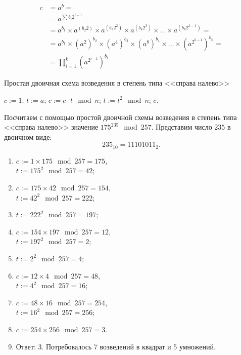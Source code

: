 \[\begin{array}{ll}
c & = a^b = \\
  & = a^{\sum b_i 2^{i-1}} = \\
  & = a^{b_1} \times a^{(b_2 2)} \times a^{(b_3 2^2)} \times a^{(b_4 2^3)} \times \dots \times a^{(b_k 2^{k-1})} = \\
  & = a^{b_1} \times \left(a^2\right)^{b_2} \times \left(a^4\right)^{b_3} \times \left(a^8\right)^{b_4} \times \dots \times \left(a^{2^{k-1}}\right)^{b_k} = \\
  & = \prod\limits_{i=1}^{k} \left(a^{2^{i-1}}\right)^{b_i}
\end{array}\]

\begin{algorithm}[iht]
	\caption{Простая двоичная схема возведения в степень типа <<справа налево>>\label{alg:power-mod-right-to-left}}
	\begin{algorithmic}
		\STATE $c := 1$;
		\STATE $t := a$;
				\STATE $c := c \cdot t \mod n$;
			\ENDIF
			\STATE $t := t^2 \mod n$;
		\ENDFOR
		\RETURN $c$.
	\end{algorithmic}
\end{algorithm}

\example Посчитаем с помощью простой двоичной схемы возведения в степень типа <<справа налево>> значение $175^{235} \mod 257$. Представим число $235$ в двоичном виде:
\[ 235_{10} = 11101011_{2}.\]
\begin{enumerate}
	\item $ c := 1 \times 175 \mod 257 = 175$, \\
		$ t:= 175^2 \mod 257 = 42$;
	\item $ c := 175 \times 42 \mod 257 = 154$, \\
		$ t:= 42^2 \mod 257 = 222$;
	\item $ t:= 222^2 \mod 257 = 197$;
	\item $ c := 154 \times 197 \mod 257 = 12$, \\
		$ t:= 197^2 \mod 257 = 2$;
	\item $ t:= 2^2 \mod 257 = 4$;
	\item $ c := 12 \times 4 \mod 257 = 48$, \\
		$ t:= 4^2 \mod 257 = 16$;
	\item $ c := 48 \times 16 \mod 257 = 254$, \\
		$ t:= 16^2 \mod 257 = 256$;
	\item $ c := 254 \times 256 \mod 257 = 3$.
	\item Ответ: 3. Потребовалось 7 возведений в квадрат и 5 умножений.
\end{enumerate}
\exampleend




